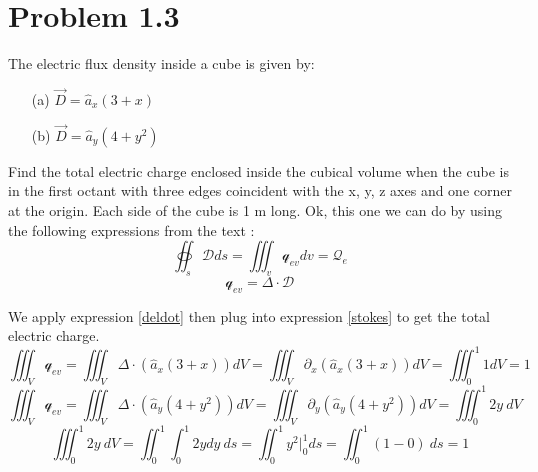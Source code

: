 \documentclass[12pt]{article}
\begin{document}
\section*{Problem 1.3}
The electric flux density inside a cube is given by:
\begin{itemize}
    \item[(a)] \( \vec{D} = \hat{a}_x (3 + x) \)
    \item[(b)] \( \vec{D} = \hat{a}_y (4 + y^2) \)
\end{itemize}
Find the total electric charge enclosed inside the cubical volume when the cube is in the first octant with three edges coincident with the x, y, z axes and one corner at the origin. Each side of the cube is 1 m long.
\newline
Ok, this one we can do by using the following expressions from the text \cite{balanis_2012}:
\begin{equation}\label{stokes}
  \oiint_{s}\bm{\mathcal{D}}ds = \iiint_{v} \mathcal{q}_{ev}dv =  \mathscr{Q}_{e}
\end{equation}
\begin{equation}\label{deldot}
  \mathcal{q}_{ev} =  \Delta \cdot \bm{\mathcal{D}}   
\end{equation}

We apply expression \ref{deldot} then plug into expression \ref{stokes} to get the total electric charge.
\begin{equation*}
  \iiint_{V}\mathcal{q}_{ev} = \iiint_{V}\Delta \cdot (\hat a_x (3+x))dV = \iiint_{V} \partial_x (\hat a_x (3+x))dV= \iiint_{0}^{1}1dV= 1 
\end{equation*}
\begin{equation*}
    \iiint_{V}\mathcal{q}_{ev} = \iiint_{V}\Delta \cdot (\hat a_y (4+y^2))dV =  \iiint_{V} \partial_y (\hat a_y (4+y^2))dV = \iiint_{0}^{1}2y\ dV
\end{equation*}
\begin{equation*}
\iiint_{0}^{1}2y\ dV = \iint_{0}^{1}\int_{0}^{1}2ydy\ ds = \iint_{0}^{1}y^2|_{0}^{1} ds =  \iint_{0}^{1}(1-0)\ ds = 1
\end{equation*}
\end{document}
